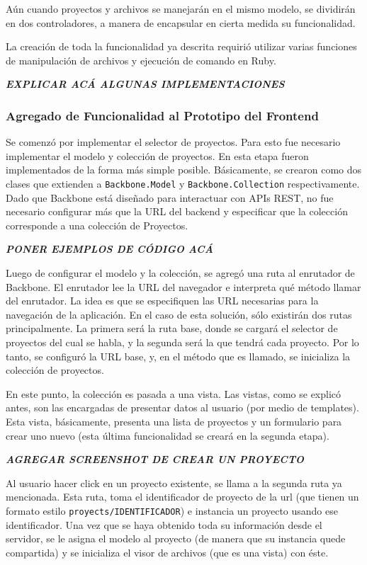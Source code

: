 \documentclass[12pt,titlepage,]{article}
\begin{document}
Aún cuando proyectos y archivos se manejarán en el mismo modelo, se
dividirán en dos controladores, a manera de encapsular en cierta medida
su funcionalidad.

La creación de toda la funcionalidad ya descrita requirió utilizar
varias funciones de manipulación de archivos y ejecución de comando en
Ruby.

\textbf{\emph{EXPLICAR ACÁ ALGUNAS IMPLEMENTACIONES}}

\subsubsection{Agregado de Funcionalidad al Prototipo del Frontend}

Se comenzó por implementar el selector de proyectos. Para esto fue
necesario implementar el modelo y colección de proyectos. En esta etapa
fueron implementados de la forma más simple posible. Básicamente, se
crearon como dos clases que extienden a \texttt{Backbone.Model} y
\texttt{Backbone.Collection} respectivamente. Dado que Backbone está
diseñado para interactuar con APIs REST, no fue necesario configurar más
que la URL del backend y especificar que la colección corresponde a una
colección de Proyectos.

\textbf{\emph{PONER EJEMPLOS DE CÓDIGO ACÁ}}

Luego de configurar el modelo y la colección, se agregó una ruta al
enrutador de Backbone. El enrutador lee la URL del navegador e
interpreta qué método llamar del enrutador. La idea es que se
especifiquen las URL necesarias para la navegación de la aplicación. En
el caso de esta solución, sólo existirán dos rutas principalmente. La
primera será la ruta base, donde se cargará el selector de proyectos del
cual se habla, y la segunda será la que tendrá cada proyecto. Por lo
tanto, se configuró la URL base, y, en el método que es llamado, se
inicializa la colección de proyectos.

En este punto, la colección es pasada a una vista. Las vistas, como se
explicó antes, son las encargadas de presentar datos al usuario (por
medio de templates). Esta vista, básicamente, presenta una lista de
proyectos y un formulario para crear uno nuevo (esta última
funcionalidad se creará en la segunda etapa).

\textbf{\emph{AGREGAR SCREENSHOT DE CREAR UN PROYECTO}}

Al usuario hacer click en un proyecto existente, se llama a la segunda
ruta ya mencionada. Esta ruta, toma el identificador de proyecto de la
url (que tienen un formato estilo \texttt{proyects/IDENTIFICADOR}) e
instancia un proyecto usando ese identificador. Una vez que se haya
obtenido toda su información desde el servidor, se le asigna el modelo
al proyecto (de manera que su instancia quede compartida) y se
inicializa el visor de archivos (que es una vista) con éste.
\end{document}
